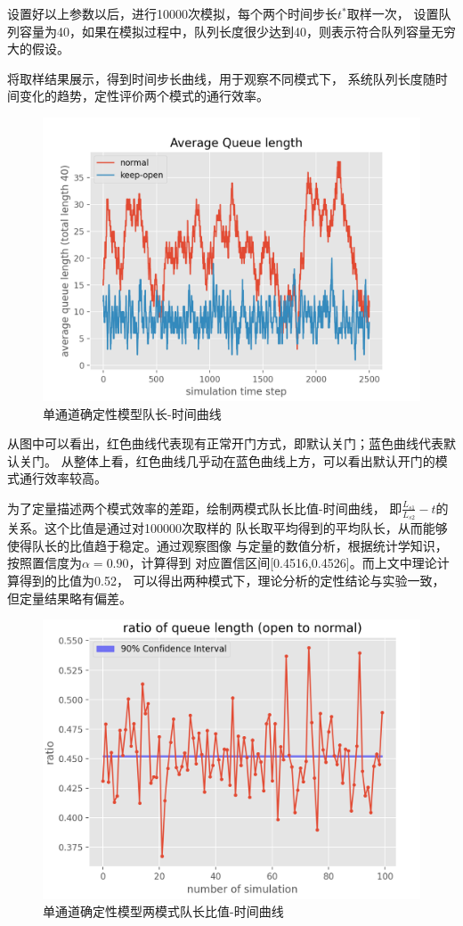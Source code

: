 设置好以上参数以后，进行10000次模拟，每个两个时间步长$t^*$取样一次，
设置队列容量为40，如果在模拟过程中，队列长度很少达到40，则表示符合队列容量无穷大的假设。

将取样结果展示，得到时间步长曲线，用于观察不同模式下，
系统队列长度随时间变化的趋势，定性评价两个模式的通行效率。
\begin{figure}[ht]    
    \centering
    \includegraphics[width=.7\textwidth]{images/队长-时间曲线.png}
    \caption{单通道确定性模型队长-时间曲线}
    \label{fig:queue-length-time}
\end{figure}
从图中可以看出，红色曲线代表现有正常开门方式，即默认关门；蓝色曲线代表默认关门。
从整体上看，红色曲线几乎动在蓝色曲线上方，可以看出默认开门的模式通行效率较高。

为了定量描述两个模式效率的差距，绘制两模式队长比值-时间曲线，
即$\frac{L_{s1}}{L_{s2}}-t$的关系。这个比值是通过对100000次取样的
队长取平均得到的平均队长，从而能够使得队长的比值趋于稳定。通过观察图像
与定量的数值分析，根据统计学知识，按照置信度为$\alpha=0.90$，计算得到
对应置信区间[0.4516,0.4526]。而上文中理论计算得到的比值为0.52，
可以得出两种模式下，理论分析的定性结论与实验一致，但定量结果略有偏差。
\begin{figure}[ht]    
    \centering
    \includegraphics[width=.7\textwidth]{images/队长比例-时间曲线.png}
    \caption{单通道确定性模型两模式队长比值-时间曲线}
    \label{fig:length ratio-time curve}
\end{figure}


